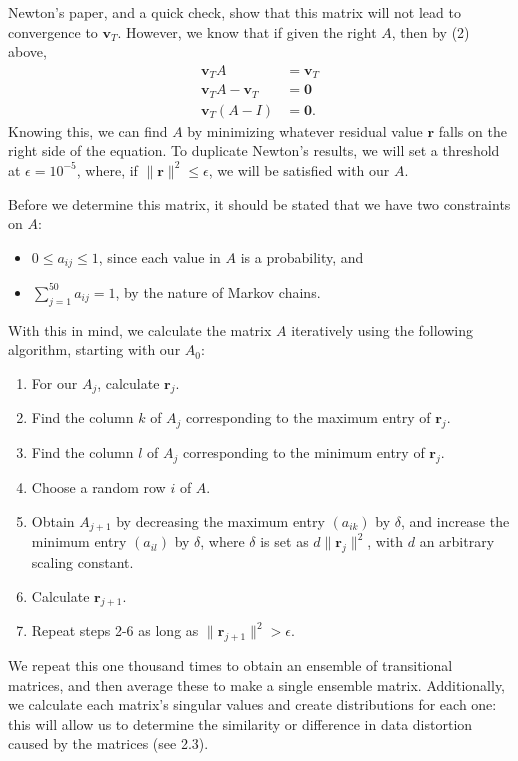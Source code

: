 \documentclass[letterpaper,12pt]{article}
\newcommand{\vect}[1]{\boldsymbol{#1}}
\begin{document}
Newton's paper, and a quick check, show that this matrix will not lead to convergence to $\vect{v}_T$. However, we know that if given the right $A$, then by (2) above,
\begin{align*}
\vect{v}_T A &= \vect{v}_T \\
\vect{v}_T A - \vect{v}_T &= \vect{0} \\
\vect{v}_T (A - I) &= \vect{0}.
\end{align*}
Knowing this, we can find $A$ by minimizing whatever residual value $\vect{r}$ falls on the right side of the equation. To duplicate Newton's results, we will set a threshold at $\epsilon = 10^{-5}$, where, if $\| \vect{r} \|^2 \leq \epsilon$, we will be satisfied with our $A$.

Before we determine this matrix, it should be stated that we have two constraints on $A$:
\begin{itemize}
\item $0 \leq a_{ij} \leq 1$, since each value in $A$ is a probability, and
\item $\sum_{j = 1}^{50} a_{ij} = 1$, by the nature of Markov chains.
\end{itemize}
With this in mind, we calculate the matrix $A$ iteratively using the following algorithm, starting with our $A_0$:
\begin{enumerate}
\item For our $A_j$, calculate $\vect{r}_j$.
\item Find the column $k$ of $A_j$ corresponding to the maximum entry of $\vect{r}_j$.
\item Find the column $l$ of $A_j$ corresponding to the minimum entry of $\vect{r}_j$.
\item Choose a random row $i$ of $A$.
\item Obtain $A_{j + 1}$ by decreasing the maximum entry $(a_{ik})$ by $\delta$, and increase the minimum entry $(a_{il})$ by $\delta$, where $\delta$ is set as $d \| \vect{r}_j \|^2$, with $d$ an arbitrary scaling constant.
\item Calculate $\vect{r}_{j+1}$.
\item Repeat steps 2-6 as long as $\| \vect{r}_{j + 1} \|^2 > \epsilon$.
\end{enumerate}

We repeat this one thousand times to obtain an ensemble of transitional matrices, and then average these to make a single ensemble matrix. Additionally, we calculate each matrix's singular values and create distributions for each one: this will allow us to determine the similarity or difference in data distortion caused by the matrices (see 2.3).
\end{document}
